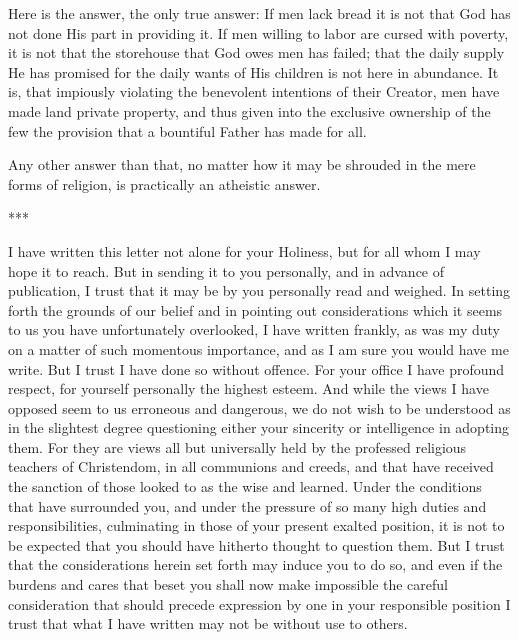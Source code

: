 \documentclass{book}
\begin{document}
Here is the answer, the only true answer: If men lack bread it is not that God has not done His part in providing it. If men willing to labor are cursed with poverty, it is not that the storehouse that God owes men has failed; that the daily supply He has promised for the daily wants of His children is not here in abundance. It is, that impiously violating the benevolent intentions of their Creator, men have made land private property, and thus given into the exclusive ownership of the few the provision that a bountiful Father has made for all.

Any other answer than that, no matter how it may be shrouded in the mere forms of religion, is practically an atheistic answer.

***

I have written this letter not alone for your Holiness, but for all whom I may hope it to reach. But in sending it to you personally, and in advance of publication, I trust that it may be by you personally read and weighed. In setting forth the grounds of our belief and in pointing out considerations which it seems to us you have unfortunately overlooked, I have written frankly, as was my duty on a matter of such momentous importance, and as I am sure you would have me write. But I trust I have done so without offence. For your office I have profound respect, for yourself personally the highest esteem. And while the views I have opposed seem to us erroneous and dangerous, we do not wish to be understood as in the slightest degree questioning either your sincerity or intelligence in adopting them. For they are views all but universally held by the professed religious teachers of Christendom, in all communions and creeds, and that have received the sanction of those looked to as the wise and learned. Under the conditions that have surrounded you, and under the pressure of so many high duties and responsibilities, culminating in those of your present exalted position, it is not to be expected that you should have hitherto thought to question them. But I trust that the considerations herein set forth may induce you to do so, and even if the burdens and cares that beset you shall now make impossible the careful consideration that should precede expression by one in your responsible position I trust that what I have written may not be without use to others.
\end{document}
